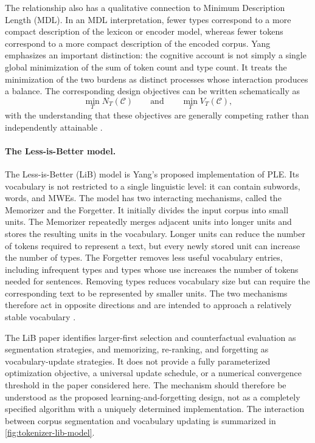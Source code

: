 The relationship also has a qualitative connection to Minimum Description Length (MDL). In an MDL interpretation, fewer types correspond to a more compact description of the lexicon or encoder model, whereas fewer tokens correspond to a more compact description of the encoded corpus. Yang emphasizes an important distinction: the cognitive account is not simply a single global minimization of the sum of token count and type count. It treats the minimization of the two burdens as distinct processes whose interaction produces a balance. The corresponding design objectives can be written schematically as
\begin{equation}
    \min_T N_T(\mathcal{C})
    \qquad\text{and}\qquad
    \min_T V_T(\mathcal{C}),
    \label{eq:tokenizer-two-objectives}
\end{equation}
with the understanding that these objectives are generally competing rather than independently attainable \parencite{yang2024rethinking}.

\paragraph{The Less-is-Better model.}
The Less-is-Better (LiB) model is Yang's proposed implementation of PLE. Its vocabulary is not restricted to a single linguistic level: it can contain subwords, words, and MWEs. The model has two interacting mechanisms, called the Memorizer and the Forgetter. It initially divides the input corpus into small units. The Memorizer repeatedly merges adjacent units into longer units and stores the resulting units in the vocabulary. Longer units can reduce the number of tokens required to represent a text, but every newly stored unit can increase the number of types. The Forgetter removes less useful vocabulary entries, including infrequent types and types whose use increases the number of tokens needed for sentences. Removing types reduces vocabulary size but can require the corresponding text to be represented by smaller units. The two mechanisms therefore act in opposite directions and are intended to approach a relatively stable vocabulary \parencite{yang2024rethinking}.

The LiB paper identifies larger-first selection and counterfactual evaluation as segmentation strategies, and memorizing, re-ranking, and forgetting as vocabulary-update strategies. It does not provide a fully parameterized optimization objective, a universal update schedule, or a numerical convergence threshold in the paper considered here. The mechanism should therefore be understood as the proposed learning-and-forgetting design, not as a completely specified algorithm with a uniquely determined implementation. The interaction between corpus segmentation and vocabulary updating is summarized in \cref{fig:tokenizer-lib-model}.

